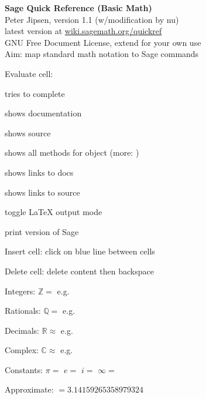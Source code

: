 \documentclass[a4paper]{article}
\begin{document}
\begin{multicols*}{3}
\begin{center}
\textbf{Sage Quick Reference (Basic Math)}\\
Peter Jipsen, version 1.1
(w/modification by nu)
\\
latest version at \url{wiki.sagemath.org/quickref}\\
GNU Free Document License, extend for your own use\\
Aim: map standard math notation to Sage commands
\end{center}
\vspace{-2ex}

Evaluate cell: \shiftEnterkey{}

\tabkey{} tries to complete 

\tabkey{} shows documentation

\tabkey{} shows source

\tabkey{} shows all methods for object  \quad
(more: )

 \quad shows links to docs

 \quad shows links to source

 \quad toggle \LaTeX{} output mode

 \quad print version of Sage

Insert cell: click on blue line between cells

Delete cell: delete content then backspace


Integers: $\mathbb Z=$  e.g. 

Rationals: $\mathbb Q=$  e.g. 

Decimals: $\mathbb R\approx$  e.g. 

Complex: $\mathbb C\approx$  e.g. 


Constants: $\pi=$  \quad $e=$  \quad $i=$ 
\quad $\infty=$ 

Approximate:  $=3.14159265358979324$


\end{multicols*}
\end{document}
